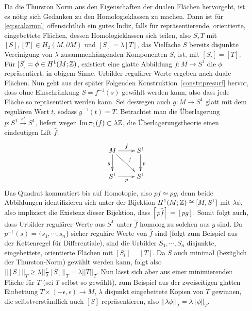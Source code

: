             Da die Thurston Norm aus den Eigenschaften der dualen Flächen hervorgeht, ist es nötig sich Gedanken zu den Homologieklassen zu machen. Dann ist für \ref{eq:scalarmul} offensichtlich ein gutes Indiz, falls für repräsentierende, orientierte, eingebettete Flächen, dessen Homologieklassen sich teilen, also $S,T$ mit $[S],[T]\in H_2(M,\partial M)$ und $[S]=\lambda [T]$, das Vielfache $S$ bereits disjunkte Vereinigung von $\lambda$ zusammenhängenden Komponenten $S_i$ ist, mit $[S_i]=[T]$. \\
            Für $[S]=\phi \in H^1(M;\mathbb{Z})$, existiert eine glatte Abbildung $f:M \to S^1$ die $\phi$ repräsentiert, in obigem Sinne. Urbilder regulärer Werte ergeben nach  duale Flächen. Nun geht aus der später Folgenden Konstruktion~\ref{constr:presurf} hervor, dass ohne Einschränkung $S=f^{-1}(s)$ gewählt werden kann, also dass jede Fläche so repräsentiert werden kann. Sei deswegen auch $g:M \to S^1$ glatt mit dem regulären Wert $t$, sodass $g^{-1}(t)=T$. Betrachtet man die Überlagerung $p: S^1 \stackrel {z^\lambda} \to  S^1$, liefert wegen $\operatorname{Im}\pi_1(f) \subset \lambda \mathbb{Z}$, die Überlagerungstheorie einen eindeutigen Lift $\hat f$:
            \[
                \begin{xy}
                    \xymatrix{M \ar[r]^{\hat f} \ar[d]_g \ar[dr]^f&S^1 \ar[d]^p \\
                             S^1 \ar[r]_p & S^1}
                \end{xy}
            \]
            Das Quadrat kommutiert bis auf Homotopie, also $p\hat f \simeq p g$, denn beide Abbildungen identifizieren sich unter der Bijektion $H^1(M;\mathbb{Z}) \cong [M,S^1]$ mit $\lambda \phi$, also impliziert die Existenz dieser Bijektion, dass $[p\hat f] = [pg]$. Somit folgt auch, dass Urbilder regulärer Werte aus $S^1$ unter $\hat f$ homolog zu solchen aus $g$ sind. Da $p^{-1}(s)=\{s_1,\cdots,s_n\}$ sicher reguläre Werte von $\hat f$ sind (folgt zum Beispiel aus der Kettenregel für Differentiale), sind die Urbilder $S_1,\cdots,S_n$ disjunkte, eingebettete, orientierte Flächen mit $[S_i]=[T]$. Da $S$ auch minimal (bezüglich der Thurston-Norm) gewählt werden kann, folgt also $||[S]||_T \geq \lambda ||\frac 1\lambda [S]||_T = \lambda ||T||_T$. Nun lässt sich aber aus einer minimierenden Fläche für $T$ (sei $T$ selbst so gewählt), zum Beispiel aus der zweiseitigen glatten Einbettung $T \times (-\epsilon,\epsilon) \to M$, $\lambda$ disjunkt eingebettete Kopien von $T$ gewinnen, die selbstverständlich auch $[S]$ repräsentieren, also $||\lambda \phi||_T = \lambda ||\phi||_T$.\\

